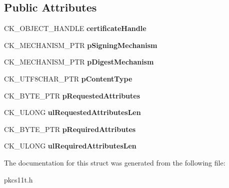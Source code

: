 \subsection*{Public Attributes}
\begin{DoxyCompactItemize}
\item 
\mbox{\label{struct_c_k___c_m_s___s_i_g___p_a_r_a_m_s_af159e64a054b24fafda6eb8187d5177c}} 
C\+K\+\_\+\+O\+B\+J\+E\+C\+T\+\_\+\+H\+A\+N\+D\+LE {\bfseries certificate\+Handle}
\item 
\mbox{\label{struct_c_k___c_m_s___s_i_g___p_a_r_a_m_s_a1b49871315d18fd726c6871cd971236c}} 
C\+K\+\_\+\+M\+E\+C\+H\+A\+N\+I\+S\+M\+\_\+\+P\+TR {\bfseries p\+Signing\+Mechanism}
\item 
\mbox{\label{struct_c_k___c_m_s___s_i_g___p_a_r_a_m_s_a63ba4f2d4e7be8d102e93a286a1d7877}} 
C\+K\+\_\+\+M\+E\+C\+H\+A\+N\+I\+S\+M\+\_\+\+P\+TR {\bfseries p\+Digest\+Mechanism}
\item 
\mbox{\label{struct_c_k___c_m_s___s_i_g___p_a_r_a_m_s_a677aa9778cdf65f7ddd4ce4d687bb2dd}} 
C\+K\+\_\+\+U\+T\+F8\+C\+H\+A\+R\+\_\+\+P\+TR {\bfseries p\+Content\+Type}
\item 
\mbox{\label{struct_c_k___c_m_s___s_i_g___p_a_r_a_m_s_a3e8777dbb5a643832e3af176b148b8e0}} 
C\+K\+\_\+\+B\+Y\+T\+E\+\_\+\+P\+TR {\bfseries p\+Requested\+Attributes}
\item 
\mbox{\label{struct_c_k___c_m_s___s_i_g___p_a_r_a_m_s_af6078bfc01a13e7ae2556fb806000a4f}} 
C\+K\+\_\+\+U\+L\+O\+NG {\bfseries ul\+Requested\+Attributes\+Len}
\item 
\mbox{\label{struct_c_k___c_m_s___s_i_g___p_a_r_a_m_s_ab1e315c86bada47d945738b351936ca9}} 
C\+K\+\_\+\+B\+Y\+T\+E\+\_\+\+P\+TR {\bfseries p\+Required\+Attributes}
\item 
\mbox{\label{struct_c_k___c_m_s___s_i_g___p_a_r_a_m_s_a0849e6c4b7613787007c2b657f77810a}} 
C\+K\+\_\+\+U\+L\+O\+NG {\bfseries ul\+Required\+Attributes\+Len}
\end{DoxyCompactItemize}


The documentation for this struct was generated from the following file\+:\begin{DoxyCompactItemize}
\item 
pkcs11t.\+h\end{DoxyCompactItemize}
